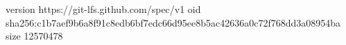 version https://git-lfs.github.com/spec/v1
oid sha256:c1b7aef9b6a8f91c8edb6bf7edc66d95ee8b5ac42636a0c72f768dd3a08954ba
size 12570478
